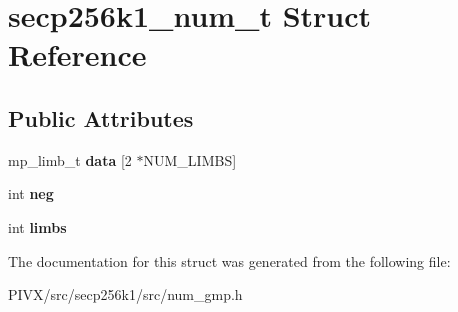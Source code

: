 \hypertarget{structsecp256k1__num__t}{}\section{secp256k1\+\_\+num\+\_\+t Struct Reference}
\label{structsecp256k1__num__t}
\subsection*{Public Attributes}
\begin{DoxyCompactItemize}
\item 
\mbox{\label{structsecp256k1__num__t_a065d2990a2593fc614acdb03eb2d8ccd}} 
mp\+\_\+limb\+\_\+t {\bfseries data} \mbox{[}2 $\ast$N\+U\+M\+\_\+\+L\+I\+M\+BS\mbox{]}
\item 
\mbox{\label{structsecp256k1__num__t_a4ad0e79d257b25a800bbc6cf4d3b45a8}} 
int {\bfseries neg}
\item 
\mbox{\label{structsecp256k1__num__t_a30a7b1070d6d8b9d03a3a21851c06e13}} 
int {\bfseries limbs}
\end{DoxyCompactItemize}


The documentation for this struct was generated from the following file\+:\begin{DoxyCompactItemize}
\item 
P\+I\+V\+X/src/secp256k1/src/num\+\_\+gmp.\+h\end{DoxyCompactItemize}
